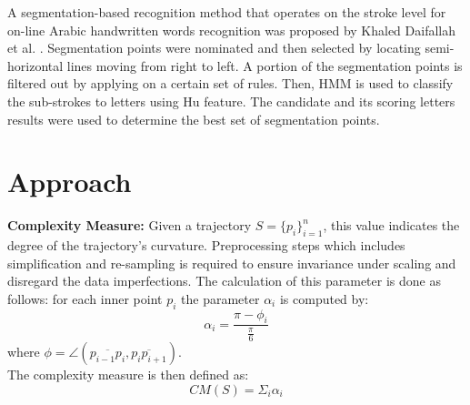 \documentclass[journal,compsoc]{IEEEtran}
\begin{document}
A segmentation-based recognition method that operates on the stroke level for on-line Arabic handwritten words recognition was proposed by Khaled Daifallah et al. \cite{daifallah2009recognition}. 
Segmentation points were nominated and then selected by locating semi-horizontal lines moving from right to left. 
A portion of the segmentation points is filtered out by applying on a certain set of rules. 
Then, HMM is used to classify the sub-strokes to letters using Hu feature. 
The candidate and its scoring letters results were used to determine the best set of segmentation points.\\


\section{Approach}
\label{sec:approach}

\textbf{Complexity Measure:} Given a trajectory $S=\{{p_i}\}_{i=1}^{n}$, this value indicates the degree of the trajectory's curvature. 
Preprocessing steps which includes simplification and re-sampling is required to ensure invariance under scaling and disregard the data imperfections. 
The calculation of this parameter is done as follows: for each inner point $p_i$ the parameter $\alpha_{i}$ is computed by:
\begin{equation}
 \alpha_{i}=\frac{\pi-\phi_{i}}{\frac{\pi}{6}}
\end{equation}
where $\phi=\angle(\overline{p_{i-1}p_{i}},\overline{p_{i}p_{i+1}})$.\\ 
The complexity measure is then defined as:
\begin{equation}
CM(S)=\Sigma_{i}\alpha_{i}
\end{equation}\\

\end{document}
